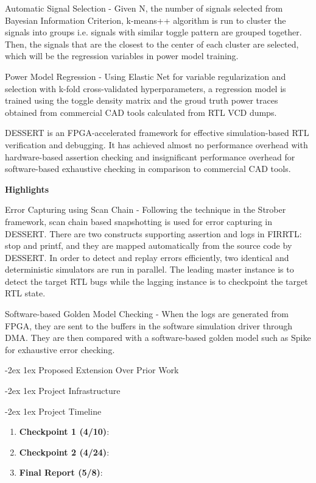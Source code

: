 \documentclass[11pt]{article}
\makeatletter
\renewcommand{\section}
{\@startsection {section}{1}{0pt}
 {-2ex}
 {1ex}
 {\bfseries\Large}}
\makeatother
\begin{document}
Automatic Signal Selection - Given N, the number of signals selected from Bayesian Information Criterion, k-means++ algorithm is run to cluster the signals into groups i.e. signals with similar toggle pattern are grouped together. Then, the signals that are the closest to the center of each cluster are selected, which will be the regression variables in power model training.

Power Model Regression - Using Elastic Net for variable regularization and selection with k-fold cross-validated hyperparameters, a regression model is trained using the toggle density matrix and the groud truth power traces obtained from commercial CAD tools calculated from RTL VCD dumps.

DESSERT\autocite{dessert} is an FPGA-accelerated framework for effective simulation-based RTL verification and debugging. It has achieved almost no performance overhead with hardware-based assertion checking and insignificant performance overhead for software-based exhaustive checking in comparison to commercial CAD tools.

\textbf{Highlights}

Error Capturing using Scan Chain - Following the technique in the Strober framework, scan chain based snapshotting is used for error capturing in DESSERT. There are two constructs supporting assertion and logs in FIRRTL: stop and printf, and they are mapped automatically from the source code by DESSERT. In order to detect and replay errors efficiently, two identical and deterministic simulators are run in parallel. The leading master instance is to detect the target RTL bugs while the lagging instance is to checkpoint the target RTL state.

Software-based Golden Model Checking - When the logs are generated from FPGA, they are sent to the
buffers in the software simulation driver through DMA. They are then compared with a software-based golden model such as Spike for exhaustive error checking.

\section{Proposed Extension Over Prior Work}

\section{Project Infrastructure}

\section{Project Timeline}

\begin{enumerate}
  \item \textbf{Checkpoint 1 (4/10)}:
  \item \textbf{Checkpoint 2 (4/24)}:
  \item \textbf{Final Report (5/8)}:
\end{enumerate}

\printbibliography
\end{document}
